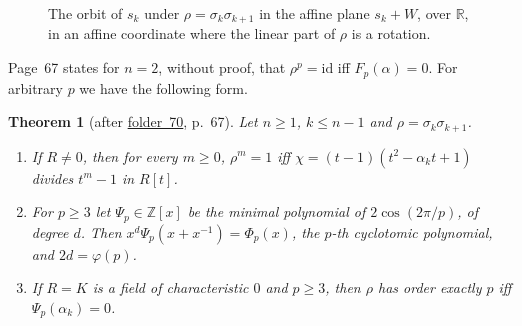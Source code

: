 \documentclass[11pt,a4paper]{amsart}
\newtheorem{theorem}{Theorem}[section]
\theoremstyle{definition}
\theoremstyle{remark}
\newcommand{\Z}{\mathbb Z}
\newcommand{\R}{\mathbb R}
\newcommand{\id}{\mathrm{id}}
\newcommand{\fac}[1]{\href{https://grothendieck.umontpellier.fr/#1.pdf}{folder~#1}}
\begin{document}
\begin{figure}[ht]
\centering
{}
\caption{The orbit of $s_k$ under $\rho = \sigma_k\sigma_{k+1}$ in the affine plane $s_k + W$, over $\R$, in an affine coordinate where the linear part of $\rho$ is a rotation.}\label{fig:orders}
\end{figure}

Page~67 states for $n = 2$, without proof, that $\rho^p = \id$ iff $F_p(\alpha) = 0$. For arbitrary $p$ we have the following form.

\begin{theorem}[after \fac{70}, p.~67]\label{thm:anyp}
Let $n \ge 1$, $k \le n-1$ and $\rho = \sigma_k\sigma_{k+1}$.
\begin{enumerate}
\item If $R \ne 0$, then for every $m \ge 0$, $\rho^m = 1$ iff $\chi = (t-1)(t^2 - \alpha_kt + 1)$ divides $t^m - 1$ in $R[t]$.
\item For $p \ge 3$ let $\Psi_p \in \Z[x]$ be the minimal polynomial of $2\cos(2\pi/p)$, of degree $d$. Then $x^d\Psi_p(x + x^{-1}) = \Phi_p(x)$, the $p$-th cyclotomic polynomial, and $2d = \varphi(p)$.
\item If $R = K$ is a field of characteristic $0$ and $p \ge 3$, then $\rho$ has order exactly $p$ iff $\Psi_p(\alpha_k) = 0$.
\end{enumerate}
\end{theorem}
\end{document}
